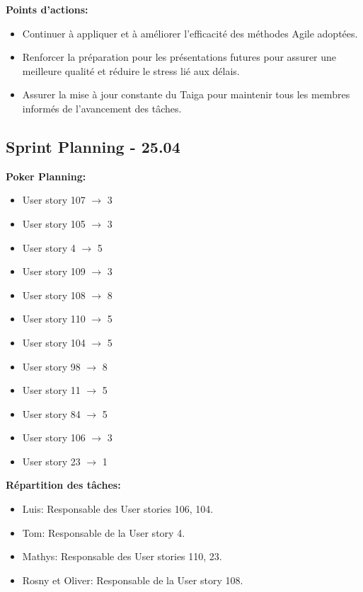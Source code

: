\documentclass[11pt]{article}
\begin{document}
\textbf{Points d'actions:}
\begin{itemize}
  \item Continuer à appliquer et à améliorer l'efficacité des méthodes Agile adoptées.
  \item Renforcer la préparation pour les présentations futures pour assurer une meilleure qualité et réduire le stress lié aux délais.
  \item Assurer la mise à jour constante du Taiga pour maintenir tous les membres informés de l'avancement des tâches.
\end{itemize}








\subsection*{{\color{navy}Sprint Planning - 25.04}}

\textbf{Poker Planning:}
\begin{itemize}
    \item User story 107 $\rightarrow$ 3
    \item User story 105 $\rightarrow$ 3
    \item User story 4 $\rightarrow$ 5
    \item User story 109 $\rightarrow$ 3
    \item User story 108 $\rightarrow$ 8
    \item User story 110 $\rightarrow$ 5
    \item User story 104 $\rightarrow$ 5
    \item User story 98 $\rightarrow$ 8
    \item User story 11 $\rightarrow$ 5
    \item User story 84 $\rightarrow$ 5
    \item User story 106 $\rightarrow$ 3
    \item User story 23 $\rightarrow$ 1
\end{itemize}

\textbf{Répartition des tâches:}
\begin{itemize}
    \item Luis: Responsable des User stories 106, 104.
    \item Tom: Responsable de la User story 4.
    \item Mathys: Responsable des User stories 110, 23.
    \item Rosny et Oliver: Responsable de la User story 108.
\end{itemize}
\end{document}
